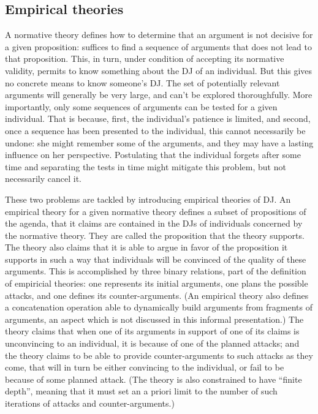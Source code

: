 \documentclass[version=last, pagesize, twoside=off, bibliography=totoc, DIV=calc, fontsize=12pt, a4paper, french, english]{scrartcl}
\begin{document}
\subsection{Empirical theories}
A normative theory defines how to determine that an argument is not decisive for a given proposition: suffices to find a sequence of arguments that does not lead to that proposition. This, in turn, under condition of accepting its normative validity, permits to know something about the \ac{DJ} of an individual. But this gives no concrete means to know someone’s \ac{DJ}. The set of potentially relevant arguments will generally be very large, and can’t be explored thoroughfully. More importantly, only some sequences of arguments can be tested for a given individual. That is because, first, the individual’s patience is limited, and second, once a sequence has been presented to the individual, this cannot necessarily be undone: she might remember some of the arguments, and they may have a lasting influence on her perspective. Postulating that the individual forgets after some time and separating the tests in time might mitigate this problem, but not necessarily cancel it. 


These two problems are tackled by introducing empirical theories of \ac{DJ}. An empirical theory for a given normative theory defines a subset of propositions of the agenda, that it claims are contained in the \acp{DJ} of individuals concerned by the normative theory. They are called the proposition that the theory supports. The theory also claims that it is able to argue in favor of the proposition it supports in such a way that individuals will be convinced of the quality of these arguments. This is accomplished by three binary relations, part of the definition of empiricial theories: one represents its initial arguments, one plans the possible attacks, and one defines its counter-arguments. (An empirical theory also defines a concatenation operation able to dynamically build arguments from fragments of arguments, an aspect which is not discussed in this informal presentation.)
The theory claims that when one of its arguments in support of one of its claims is unconvincing to an individual, it is because of one of the planned attacks; and the theory claims to be able to provide counter-arguments to such attacks as they come, that will in turn be either convincing to the individual, or fail to be because of some planned attack. (The theory is also constrained to have “finite depth”, meaning that it must set an a priori limit to the number of such iterations of attacks and counter-arguments.)
\end{document}
